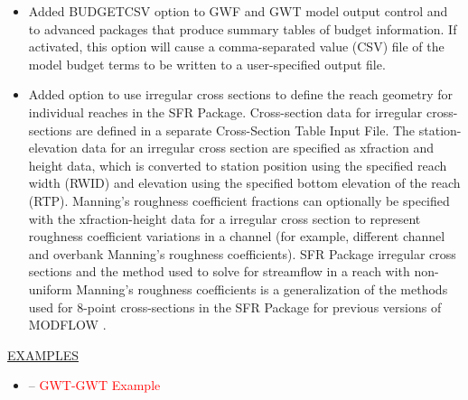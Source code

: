 \documentclass[11pt,twoside,twocolumn]{usgsreport}
\begin{document}
\begin{itemize}
\begin{itemize}
	        \item Added BUDGETCSV option to GWF and GWT model output control and to advanced packages that produce summary tables of budget information.  If activated, this option will cause a comma-separated value (CSV) file of the model budget terms to be written to a user-specified output file.
	        \item Added option to use irregular cross sections to define the reach geometry for individual reaches in the SFR Package. Cross-section data for irregular cross-sections are defined in a separate Cross-Section Table Input File. The station-elevation data for an irregular cross section are specified as xfraction and height data, which is converted to station position using the specified reach width (RWID) and elevation using the specified bottom elevation of the reach (RTP). Manning's roughness coefficient fractions can optionally be specified with the xfraction-height data for a irregular cross section to represent roughness coefficient variations in a channel (for example, different channel and overbank Manning's roughness coefficients). SFR Package irregular cross sections and the method used to solve for streamflow in a reach with non-uniform Manning's roughness coefficients is a generalization of the methods used for 8-point cross-sections in the SFR Package for previous versions of MODFLOW \citep{modflowsfr1pack}. 
	\end{itemize}
	
	\underline{EXAMPLES}
	\begin{itemize}
	        \item -- \textcolor{red}{GWT-GWT Example}
	\end{itemize}


\end{itemize}
\end{document}
